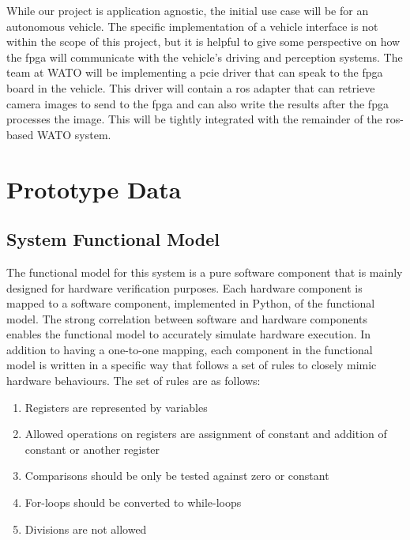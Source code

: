 \documentclass{uw-ece-wkrpt}
\begin{document}
While our project is application agnostic, the initial use case will be for an autonomous vehicle. The specific implementation of a vehicle interface is not within the scope of this project, but it is helpful to give some perspective on how the \gls{fpga} will communicate with the vehicle's driving and perception systems. The team at WATO will be implementing a \gls{pcie} driver that can speak to the \gls{fpga} board in the vehicle. This driver will contain a \gls{ros} adapter that can retrieve camera images to send to the \gls{fpga} and can also write the results after the \gls{fpga} processes the image. This will be tightly integrated with the remainder of the \gls{ros}-based WATO system.


\section{Prototype Data}

\subsection{System Functional Model}

The functional model for this system is a pure software component that is mainly designed for hardware verification purposes. Each hardware component is mapped to a software component, implemented in Python, of the functional model. The strong correlation between software and hardware components enables the functional model to accurately simulate hardware execution. In addition to having a one-to-one mapping, each component in the functional model is written in a specific way that follows a set of rules to closely mimic hardware behaviours. The set of rules are as follows:
\begin{enumerate}
    \item Registers are represented by variables
    \item Allowed operations on registers are assignment of constant and addition of constant or another register
    \item Comparisons should be only be tested against zero or constant
    \item For-loops should be converted to while-loops
    \item Divisions are not allowed
\end{enumerate}
\end{document}
